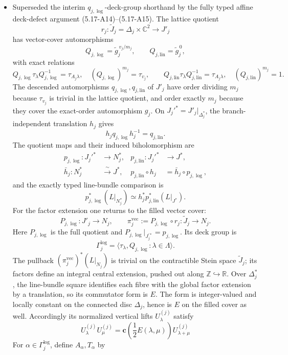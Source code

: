 \begin{itemize}[leftmargin=1.8em]
\item Superseded the interim \(q_{j,\log}\)-deck-group shorthand by the
fully typed affine deck-defect argument (5.17-A14)--(5.17-A15).  The lattice
quotient
\[
 r_j:\widetilde J_j=\Delta_j\times\mathbb C^2\longrightarrow J'_j
\]
has vector-cover automorphisms
\[
 Q_{j,\log}=\widetilde g_j^{\,v_j/m_j},\qquad
 Q_{j,\mathrm{lin}}=\widetilde g_j^{\,0},
\]
with exact relations
\[
 Q_{j,\log}\tau_\lambda Q_{j,\log}^{-1}=\tau_{A_j\lambda},
 \quad (Q_{j,\log})^{m_j}=\tau_{v_j},\qquad
 Q_{j,\mathrm{lin}}\tau_\lambda Q_{j,\mathrm{lin}}^{-1}=\tau_{A_j\lambda},
 \quad (Q_{j,\mathrm{lin}})^{m_j}=1.
\]
The descended automorphisms \(q_{j,\log},q_{j,\mathrm{lin}}\) of \(J'_j\)
have order dividing \(m_j\) because \(\tau_{v_j}\) is trivial in the lattice
quotient, and order exactly \(m_j\) because they cover the exact-order
automorphism \(g_j\).  On \(J_j'^*=J'_j|_{\Delta_j^*}\), the
branch-independent translation \(h_j\) gives
\[
 h_jq_{j,\log}h_j^{-1}=q_{j,\mathrm{lin}}.
\]
The quotient maps and their induced biholomorphism are
\[
\begin{aligned}
 p_{j,\log}:J_j'^*&\to N_j^*,&
 p_{j,\mathrm{lin}}:J_j'^*&\to J^*,\\
 \bar h_j:N_j^*&\xrightarrow{\ \sim\ }J^*,&
 p_{j,\mathrm{lin}}\circ h_j&=\bar h_j\circ p_{j,\log},
\end{aligned}
\]
and the exactly typed line-bundle comparison is
\[
 p_{j,\log}^*(L|_{N_j^*})
 \simeq h_j^*p_{j,\mathrm{lin}}^*(L|_{J^*}).
\]
For the factor extension one returns to the filled vector cover:
\[
 P_{j,\log}:J'_j\to N_j,\qquad
 \pi_j^{\mathrm{vec}}:=P_{j,\log}\circ r_j:\widetilde J_j\to N_j.
\]
Here \(P_{j,\log}\) is the full quotient and
\(P_{j,\log}|_{J_j^{\prime *}}=p_{j,\log}\).  Its deck group is
\[
 \Gamma_j^{\log}
 =\langle\tau_\lambda,Q_{j,\log}:\lambda\in\Lambda\rangle.
\]
The pullback \((\pi_j^{\mathrm{vec}})^*(L|_{N_j})\) is trivial on the
contractible Stein space \(\widetilde J_j\); its factors define an integral
central extension, pushed out along \(\mathbb Z\hookrightarrow\mathbb R\).
Over \(\Delta_j^*\), the line-bundle square identifies each fibre with the
global factor extension by a translation, so its commutator form is \(E\).
The form is integer-valued and locally constant on the connected disc
\(\Delta_j\), hence is \(E\) on the filled cover as well.  Accordingly its
normalized vertical lifts \(U_\lambda^{(j)}\) satisfy
\[
 U_\lambda^{(j)}U_\mu^{(j)}
 =\mathbf c\!\left(\frac12E(\lambda,\mu)\right)
 U_{\lambda+\mu}^{(j)}
\]
For \(\alpha\in\Gamma_j^{\log}\), define \(A_\alpha,T_\alpha\) by

\end{itemize}
